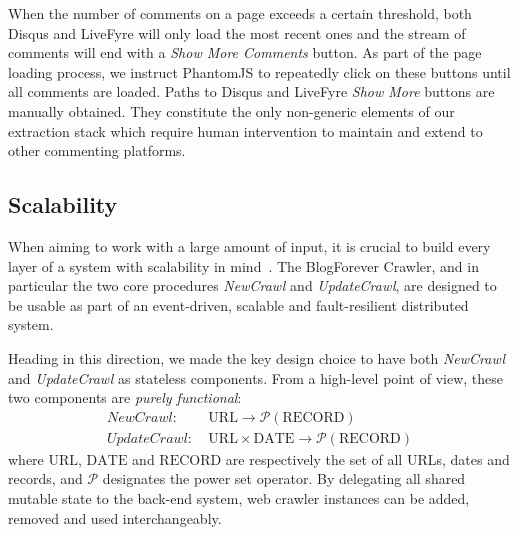 When the number of comments on a page exceeds a certain threshold, both Disqus and LiveFyre will only load the most recent ones and the stream of comments will end with a \emph{Show More Comments} button. As part of the page loading process, we instruct PhantomJS to repeatedly click on these buttons until all comments are loaded. Paths to Disqus and LiveFyre \emph{Show More} buttons are manually obtained. They constitute the only non-generic elements of our extraction stack which require human intervention to maintain and extend to other commenting platforms.


\subsection{Scalability}
When aiming to work with a large amount of input, it is crucial to build every layer of a system with scalability in mind~\cite{thereactivemanifesto2013}. The BlogForever Crawler, and in particular the two core procedures \emph{NewCrawl} and \emph{UpdateCrawl}, are designed to be usable as part of an event-driven, scalable and fault-resilient distributed system.

Heading in this direction, we made the key design choice to have both \emph{NewCrawl} and \emph{UpdateCrawl} as stateless components. From a high-level point of view, these two components are \emph{purely functional}:
%
\newcommand\URL{\text{URL}}
\newcommand\DATE{\text{DATE}}
\newcommand\RECORD{\text{RECORD}}
\begin{equation*}
  \begin{split}
    NewCrawl:    &~ \URL \rightarrow \mathcal{P}(\RECORD)\\
    UpdateCrawl: &~ \URL \times \DATE \rightarrow \mathcal{P}(\RECORD)
  \end{split}
\end{equation*}
%
where $\URL$, $\DATE$ and $\RECORD$ are respectively the set of all URLs, dates and records, and $\mathcal{P}$ designates the power set operator. By delegating all shared mutable state to the back-end system, web crawler instances can be added, removed and used interchangeably.
